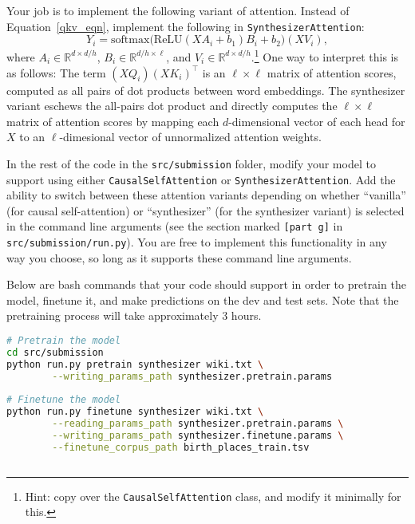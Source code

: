 \begin{enumerate}[(a)]
Your job is to implement the following variant of attention. Instead of Equation~\ref{qkv_eqn}, implement the following in \texttt{SynthesizerAttention}:
\begin{equation} 
Y_i = \text{softmax}\big(\text{ReLU}(XA_i+b_1)B_i + b_2 \big)(XV_i),
\end{equation}
where $A_i\in\mathbb{R}^{d \times d/h}$, $B_i\in\mathbb{R}^{d/h\times \ell}$, and $V_i\in\mathbb{R}^{d\times d/h}$.\footnote{Hint: copy over the \texttt{CausalSelfAttention} class, and modify it minimally for this.}
One way to interpret this is as follows: The term $(XQ_i)(XK_i)^\top$ is an $\ell \times \ell$ matrix of attention scores, computed as all pairs of dot products between word embeddings.
The synthesizer variant eschews the all-pairs dot product and directly computes the $\ell \times \ell$ matrix of attention scores by mapping each $d$-dimensional vector of each head for $X$ to an $\ell$-dimesional vector of unnormalized attention weights.

In the rest of the code in the \texttt{src/submission} folder, modify your model to support using either \texttt{CausalSelfAttention} or \texttt{SynthesizerAttention}. Add the ability to switch between these attention variants depending on whether ``vanilla'' (for causal self-attention) or ``synthesizer'' (for the synthesizer variant) is selected in the command line arguments (see the section marked \texttt{[part g]} in \texttt{src/submission/run.py}). 
You are free to implement this functionality in any way you choose, so long as it supports these command line arguments.

Below are bash commands that your code should support in order to pretrain the model, finetune it, and make predictions on the dev and test sets.
Note that the pretraining process will take approximately 3 hours.
\begin{lstlisting}[language=bash]
# Pretrain the model
cd src/submission
python run.py pretrain synthesizer wiki.txt \
        --writing_params_path synthesizer.pretrain.params
        
# Finetune the model
python run.py finetune synthesizer wiki.txt \
        --reading_params_path synthesizer.pretrain.params \
        --writing_params_path synthesizer.finetune.params \
        --finetune_corpus_path birth_places_train.tsv
        

\end{lstlisting}
\end{enumerate}
